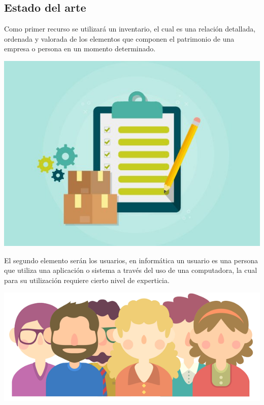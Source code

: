 \documentclass[12pt]{article}
\begin{document}
\subsection{Estado del arte}
Como primer recurso se utilizará un inventario, el cual es una relación detallada, ordenada y valorada de los elementos que componen el patrimonio de una empresa o persona en un momento determinado. 
\begin{center}

\includegraphics[scale=0.4]{IMG/inventario.jpg} \\ 

\end{center}

El segundo elemento serán los usuarios, en informática un usuario es una persona que utiliza una aplicación o sistema a través del uso de una computadora, la cual para su utilización requiere cierto nivel de experticia.  
\begin{center}

\includegraphics[scale=0.4]{IMG/usuarios.png} \\ 

\end{center}
\end{document}
